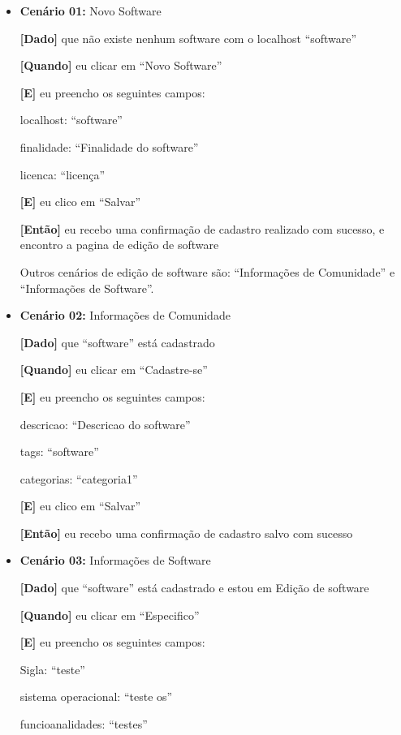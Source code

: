 \begin{itemize}
\item\textbf{Cenário 01:} Novo Software

	\textbf{[Dado]} que não existe nenhum software com o localhost ``software''

	\textbf{[Quando]} eu clicar em ``Novo Software''

	\textbf{[E]} eu preencho os seguintes campos: 

  		\subitem localhost: ``software''

  		\subitem finalidade: ``Finalidade do software''

  		\subitem licenca: ``licença''
  		
  		
	\textbf{[E]} eu clico em ``Salvar''

	\textbf{[Então]} eu recebo uma confirmação de cadastro realizado com sucesso, e encontro a pagina de edição de software


Outros cenários de edição de software são: ``Informações de Comunidade'' e ``Informações de Software''.

\item\textbf{Cenário 02:} Informações de Comunidade

	\textbf{[Dado]} que ``software'' está cadastrado

	\textbf{[Quando]} eu clicar em ``Cadastre-se''

	\textbf{[E]} eu preencho os seguintes campos: 

  		\subitem descricao: ``Descricao do software''

  		\subitem tags: ``software''

  		\subitem categorias: ``categoria1''
 
	\textbf{[E]} eu clico em ``Salvar''

	\textbf{[Então]} eu recebo uma confirmação de cadastro salvo com sucesso


\item\textbf{Cenário 03:} Informações de Software

	\textbf{[Dado]} que ``software'' está cadastrado e estou em Edição de software

	\textbf{[Quando]} eu clicar em ``Especifico''

	\textbf{[E]} eu preencho os seguintes campos: 

  		\subitem Sigla: ``teste''

  		\subitem sistema operacional: ``teste os''

  		\subitem funcioanalidades: ``testes''


\end{itemize}
